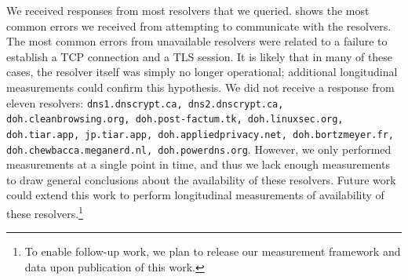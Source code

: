 We received responses from most resolvers that we queried.  
shows the most common errors we received from attempting to communicate with
the resolvers.  The most common errors from unavailable resolvers were related
to a failure to establish a TCP connection and a TLS session.  It is likely
that in many of these cases, the resolver itself was simply no longer
operational; additional longitudinal measurements could confirm this
hypothesis.  We did not receive a response from eleven resolvers:
\texttt{dns1.dnscrypt.ca, dns2.dnscrypt.ca, doh.cleanbrowsing.org,
doh.post-factum.tk, doh.linuxsec.org, doh.tiar.app, jp.tiar.app,
doh.appliedprivacy.net, doh.bortzmeyer.fr, doh.chewbacca.meganerd.nl,
doh.powerdns.org}. However, we only performed measurements at a single point
in time, and thus we lack enough measurements to draw general conclusions
about the availability of these resolvers. Future work could extend this work
to perform longitudinal measurements of availability of these
resolvers.\footnote{To
enable follow-up work, we plan to release our measurement framework and data upon
publication of this work.}



